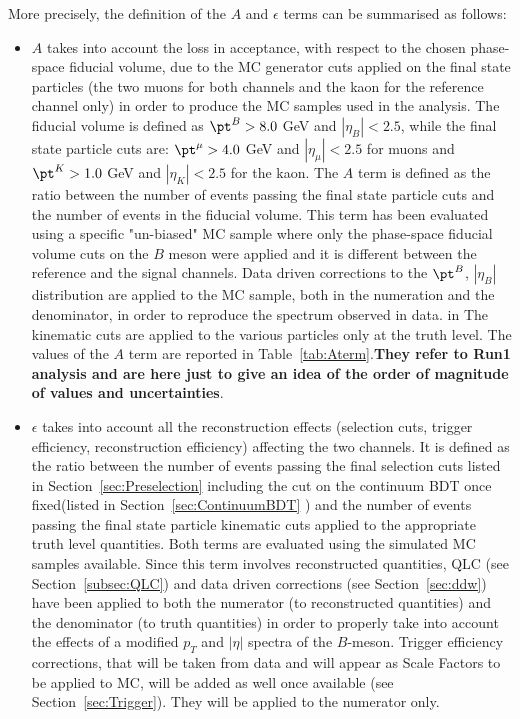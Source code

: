 More precisely, the definition of the $A$ and $\epsilon$ terms can be summarised as follows:
\begin{itemize}
\item $A$ takes into account the loss in acceptance, with respect
to the chosen phase-space fiducial volume, due to the MC generator
cuts applied on the final state particles (the two muons for both
channels and the kaon for the reference channel only) in order
to produce the MC samples used in the analysis. 
The fiducial volume is defined as $\pt^B>8.0$ GeV and $\left| \eta_B\right|<2.5$,
while the final state particle cuts are: $\pt^{\mu}>4.0$ GeV and
$\left| \eta_{\mu}\right|<2.5$ for muons and  $\pt^{K}>1.0$ GeV and
$\left| \eta_{K}\right|<2.5$ for the kaon. The $A$ term is defined
as the ratio between the number of events passing the final state
particle cuts and the number of events in the fiducial volume.
This term has been evaluated using a specific "un-biased" MC sample
where only the phase-space fiducial volume cuts on the $B$ meson
were applied and it is different between the reference and the
signal channels. 
Data driven corrections to the $\pt^B$, $\left| \eta_B\right|$ distribution are applied to the MC sample, both in the numeration and the denominator, in order to reproduce the spectrum observed in data.
in The kinematic cuts are applied to the various
particles only at the truth level. %
The values of the $A$ term are reported in Table~\ref{tab:Aterm}.\textbf{They refer to Run1 analysis and are here just to give an idea of the order of magnitude of values and uncertainties}.
\item $\epsilon$ takes into account all the reconstruction effects
(selection cuts, trigger efficiency, reconstruction efficiency)
affecting the two channels. It is defined as the ratio between the
number of events passing the final selection cuts listed in
Section~\ref{sec:Preselection} including the cut on the continuum BDT once fixed(listed in Section~\ref{sec:ContinuumBDT} ) %
and the number of events
passing the final state particle kinematic cuts applied to the appropriate
truth level quantities. Both terms are evaluated using the simulated MC
samples available. %
Since this term involves reconstructed quantities, QLC (see Section~\ref{subsec:QLC}) and data driven
corrections (see Section~\ref{sec:ddw}) have been applied to both the numerator (to reconstructed
quantities) and the denominator (to truth quantities) in order to
properly take into account the effects of a modified $p_T$ and
$\left| \eta \right|$ spectra of the $B$-meson. Trigger efficiency
corrections, that will be taken from data and will appear as Scale Factors to be applied to MC, will be added as well once available (see Section~\ref{sec:Trigger}). 
They will be applied to the numerator only. 
\end{itemize}



